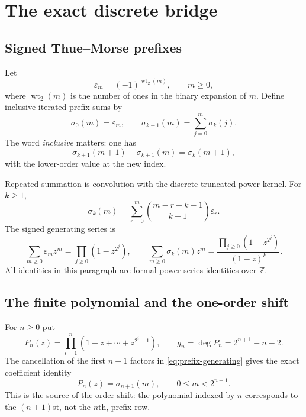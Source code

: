 \documentclass[11pt,oneside]{article}
\theoremstyle{definition}
\theoremstyle{remark}
\newcommand{\Z}{\mathbb Z}
\newcommand{\wt}{\operatorname{wt}_2}
\begin{document}
\section{The exact discrete bridge}
\label{sec:bridge}

\subsection{Signed Thue--Morse prefixes}

Let
\begin{equation}
 \varepsilon_m=(-1)^{\wt(m)},\qquad m\ge0,                 \label{eq:tm-sign}
\end{equation}
where $\wt(m)$ is the number of ones in the binary expansion of $m$.  Define inclusive
iterated prefix sums by
\begin{equation}
 \sigma_0(m)=\varepsilon_m,
 \qquad
 \sigma_{k+1}(m)=\sum_{j=0}^{m}\sigma_k(j).                \label{eq:prefix-def}
\end{equation}
The word \emph{inclusive} matters: one has
\begin{equation}
 \sigma_{k+1}(m+1)-\sigma_{k+1}(m)=\sigma_k(m+1),          \label{eq:forward-difference}
\end{equation}
with the lower-order value at the new index.

Repeated summation is convolution with the discrete truncated-power kernel.  For $k\ge1$,
\begin{equation}
 \sigma_k(m)=\sum_{r=0}^{m}\binom{m-r+k-1}{k-1}\varepsilon_r. \label{eq:prefix-convolution}
\end{equation}
The signed generating series is
\begin{equation}
 \sum_{m\ge0}\varepsilon_m z^m=\prod_{j\ge0}(1-z^{2^j}),
 \qquad
 \sum_{m\ge0}\sigma_k(m)z^m
 =\frac{\prod_{j\ge0}(1-z^{2^j})}{(1-z)^k}.               \label{eq:prefix-generating}
\end{equation}
All identities in this paragraph are formal power-series identities over $\Z$.

\subsection{The finite polynomial and the one-order shift}

For $n\ge0$ put
\begin{equation}
 P_n(z)=\prod_{i=1}^{n}(1+z+\cdots+z^{2^i-1}),
 \qquad
 g_n=\deg P_n=2^{n+1}-n-2.                                \label{eq:Pn}
\end{equation}
The cancellation of the first $n+1$ factors in \eqref{eq:prefix-generating} gives the exact
coefficient identity
\begin{equation}
 [z^m]P_n(z)=\sigma_{n+1}(m),
 \qquad 0\le m<2^{n+1}.                                   \label{eq:coefficient-bridge}
\end{equation}
This is the source of the order shift: the polynomial indexed by $n$ corresponds to the
$(n+1)$st, not the $n$th, prefix row.
\end{document}
